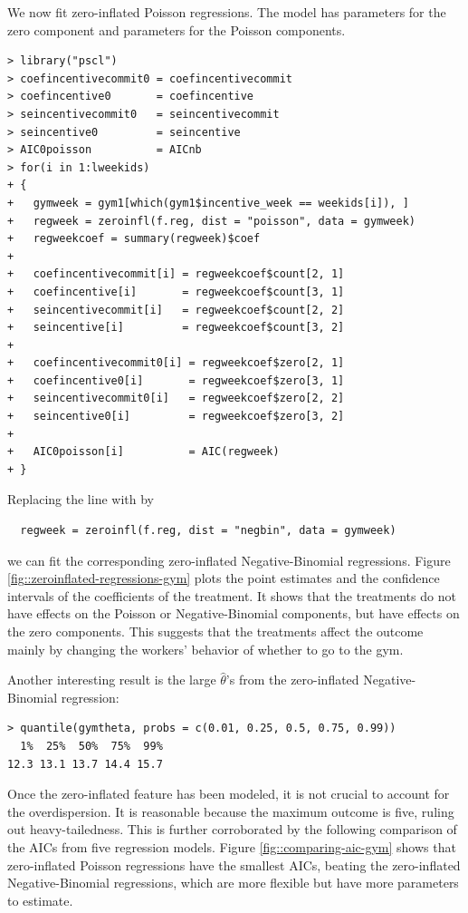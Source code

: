 We now fit zero-inflated Poisson regressions. The model has parameters for the zero component and parameters for the Poisson components. 

\begin{lstlisting}
> library("pscl")
> coefincentivecommit0 = coefincentivecommit
> coefincentive0       = coefincentive
> seincentivecommit0   = seincentivecommit
> seincentive0         = seincentive
> AIC0poisson          = AICnb
> for(i in 1:lweekids)
+ {
+   gymweek = gym1[which(gym1$incentive_week == weekids[i]), ]   
+   regweek = zeroinfl(f.reg, dist = "poisson", data = gymweek)
+   regweekcoef = summary(regweek)$coef
+   
+   coefincentivecommit[i] = regweekcoef$count[2, 1]
+   coefincentive[i]       = regweekcoef$count[3, 1]
+   seincentivecommit[i]   = regweekcoef$count[2, 2]
+   seincentive[i]         = regweekcoef$count[3, 2]
+   
+   coefincentivecommit0[i] = regweekcoef$zero[2, 1]
+   coefincentive0[i]       = regweekcoef$zero[3, 1]
+   seincentivecommit0[i]   = regweekcoef$zero[2, 2]
+   seincentive0[i]         = regweekcoef$zero[3, 2]
+   
+   AIC0poisson[i]          = AIC(regweek)
+ }
\end{lstlisting}

Replacing the line with  by 
\begin{lstlisting}
  regweek = zeroinfl(f.reg, dist = "negbin", data = gymweek)
\end{lstlisting}
we can fit the corresponding zero-inflated Negative-Binomial regressions. Figure \ref{fig::zeroinflated-regressions-gym} plots the point estimates and the confidence intervals of the coefficients of the treatment. It shows that the treatments do not have effects on the Poisson or Negative-Binomial components, but have effects on the zero components. This suggests that the treatments affect the outcome mainly by changing the workers' behavior of whether to go to the gym. 




Another interesting result is the large $\hat{\theta}$'s from the zero-inflated Negative-Binomial regression:
\begin{lstlisting}
> quantile(gymtheta, probs = c(0.01, 0.25, 0.5, 0.75, 0.99))
  1%  25%  50%  75%  99% 
12.3 13.1 13.7 14.4 15.7 
\end{lstlisting}


Once the zero-inflated feature has been modeled, it is not crucial to account for the overdispersion. It is reasonable because the maximum outcome is five, ruling out heavy-tailedness. This is further corroborated by the following comparison of the AICs from five regression models. Figure \ref{fig::comparing-aic-gym} shows that zero-inflated Poisson regressions have the smallest AICs, beating the zero-inflated Negative-Binomial regressions, which are more flexible but have more parameters to estimate. 

